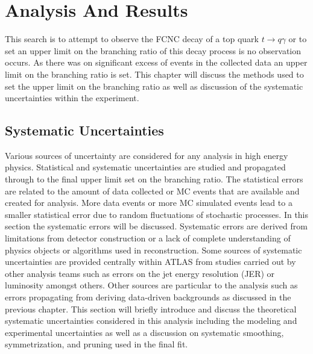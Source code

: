 
\chapter{Analysis And Results}
\label{ch:Results}
This search is to attempt to observe the FCNC decay of a top quark $t \rightarrow q \gamma$ or to set an upper limit on the branching ratio of this decay process is no observation occurs.  As there was on significant excess of events in the collected data an upper limit on the branching ratio is set.  This chapter will discuss  the methods used to set the upper limit on the branching ratio as well as discussion of the systematic uncertainties within the experiment. 

\section{Systematic Uncertainties}
Various sources of uncertainty are considered for any analysis in high energy physics.  Statistical and systematic uncertainties are studied and propagated through to the final upper limit set on the branching ratio.  The statistical errors are related to the amount of data collected or MC events that are available and created for analysis.  More data events or more MC simulated events lead to a smaller statistical error due to random fluctuations of stochastic processes.  In this section the systematic errors will be discussed.  Systematic errors are derived from limitations from detector construction or a lack of complete understanding of physics objects or algorithms used in reconstruction.  Some sources of systematic uncertainties are provided centrally within ATLAS from studies carried out by other analysis teams such as errors on the jet energy resolution (JER) or luminosity amongst others. Other sources are particular to the analysis such as errors propagating from deriving data-driven backgrounds as discussed in the previous chapter.
This section will briefly introduce and discuss the theoretical systematic uncertainties considered in this analysis including the modeling and experimental uncertainties as well as a discussion on systematic smoothing, symmetrization, and pruning used in the final fit. 

